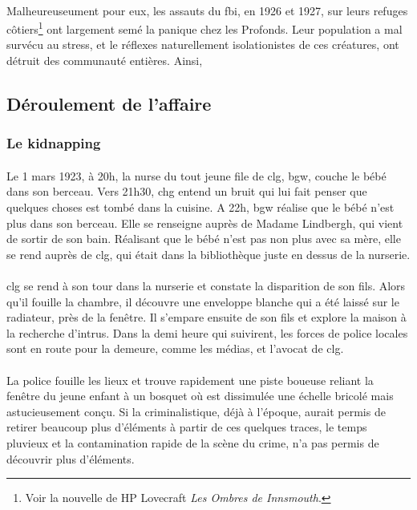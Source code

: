 \paragraph{} Malheureuseument pour eux, les assauts du \gls{fbi}, en 1926 et 1927, sur leurs refuges côtiers\footnote{
Voir la nouvelle de HP Lovecraft \emph{Les Ombres de Innsmouth}.} ont largement semé la panique chez les Profonds. Leur
population a mal survécu au stress, et le réflexes naturellement isolationistes de ces créatures, ont détruit des 
communauté entières. Ainsi, 

\subsection{Déroulement de l'affaire}
\subsubsection{Le kidnapping}
\paragraph{} Le 1 mars 1923, à 20h, la nurse du tout jeune file de \gls{clg}, \gls{bgw}, couche le bébé dans son berceau. Vers 
21h30, \gls{chg} entend un bruit qui lui fait penser que quelques choses est tombé dans la cuisine. A 22h, \gls{bgw} réalise que
le bébé n'est plus dans son berceau. Elle se renseigne auprès de Madame Lindbergh, qui vient de sortir de son bain. Réalisant que
le bébé n'est pas non plus avec sa mère, elle se rend auprès de \gls{clg}, qui était dans la bibliothèque juste en dessus de la
nurserie. 
\paragraph{} \gls{clg} se rend à son tour dans la nurserie et constate la disparition de son fils. Alors qu'il fouille la chambre,
il découvre une enveloppe blanche qui a été laissé sur le radiateur, près de la fenêtre. Il s'empare ensuite de son fils et explore 
la maison à la recherche d'intrus. Dans la demi heure qui suivirent, les forces de police locales sont en route pour la demeure,
comme les médias, et l'avocat de \gls{clg}.
\paragraph{} La police fouille les lieux et trouve rapidement une piste boueuse reliant la fenêtre du jeune enfant à un bosquet
où est dissimulée une échelle bricolé mais astucieusement conçu. Si la criminalistique, déjà à l'époque, aurait permis de retirer
beaucoup plus d'éléments à partir de ces quelques traces, le temps pluvieux et la contamination rapide de la scène du crime, n'a 
pas permis de découvrir plus d'éléments.  
